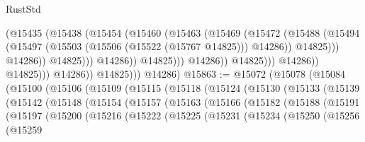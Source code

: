 \begin{lexlean}{RustStd}
\begin{coremodule}
                                            (@15435
                                              (@15438
                                                (@15454
                                                  (@15460
                                                    (@15463
                                                      (@15469
                                                        (@15472
                                                          (@15488
                                                            (@15494
                                                              (@15497
                                                                (@15503
                                                                  (@15506 (@15522 (@15767 @14825)))
                                                                  @14286))
                                                              @14825)))
                                                        @14286))
                                                    @14825)))
                                              @14286))
                                          @14825)))
                                    @14286))
                                @14825)))
                          @14286))
                      @14825)))
                @14286))
            @14825)))
      @14286)
@15863 := @15072
    (@15078
      (@15084
        (@15100
          (@15106
            (@15109
              (@15115
                (@15118
                  (@15124
                    (@15130
                      (@15133
                        (@15139
                          (@15142
                            (@15148
                              (@15154
                                (@15157
                                  (@15163
                                    (@15166
                                      (@15182
                                        (@15188
                                          (@15191
                                            (@15197
                                              (@15200
                                                (@15216
                                                  (@15222
                                                    (@15225
                                                      (@15231
                                                        (@15234
                                                          (@15250
                                                            (@15256
                                                              (@15259

\end{coremodule}
\end{lexlean}
